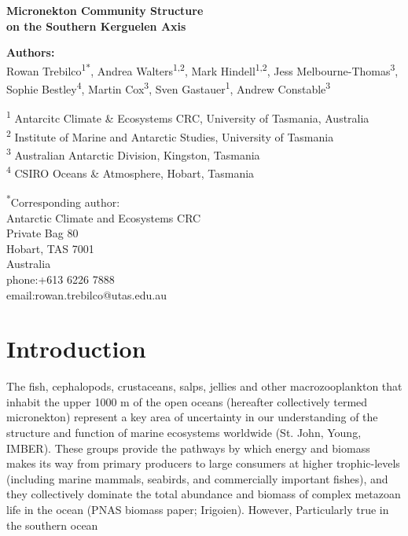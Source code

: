 \documentclass[12pt]{article}
\begin{document}
{\setlength{\parindent}{0cm}
\linenumbers
\doublespacing
\thispagestyle{empty}


\centering \large{\textbf{Micronekton Community Structure \\on the Southern Kerguelen Axis}}

\normalsize
\flushleft

\textbf{Authors:}\\
Rowan Trebilco\textsuperscript{1*},
Andrea Walters\textsuperscript{1,2},
Mark Hindell\textsuperscript{1,2},
Jess Melbourne-Thomas\textsuperscript{3},
Sophie Bestley\textsuperscript{4},
Martin Cox\textsuperscript{3},
Sven Gastauer\textsuperscript{1},
Andrew Constable\textsuperscript{3}


\textsuperscript{1} Antarcitc Climate \& Ecosystems CRC, University of Tasmania, Australia\\
\textsuperscript{2} Institute of Marine and Antarctic Studies, University of Tasmania\\ 
\textsuperscript{3} Australian Antarctic Division, Kingston, Tasmania\\ 
\textsuperscript{4} CSIRO Oceans \& Atmosphere, Hobart, Tasmania

\textsuperscript{*}Corresponding author:\\
Antarctic Climate and Ecosystems CRC\\
Private Bag 80\\
Hobart, TAS 7001\\
Australia\\
phone:+613 6226 7888\\
email:rowan.trebilco@utas.edu.au\\


\clearpage
\section{Introduction}
\linenumbers

The fish, cephalopods, crustaceans, salps, jellies and other macrozooplankton that inhabit the upper 1000 m of the open oceans (hereafter collectively termed micronekton) represent a key area of uncertainty in our understanding of the structure and function of marine ecosystems worldwide (St. John, Young, IMBER).
These groups provide the pathways by which energy and biomass makes its way from primary producers to large consumers at higher trophic-levels (including marine mammals, seabirds, and commercially important fishes), and they collectively dominate the total abundance and biomass of complex metazoan life in the ocean (PNAS biomass paper; Irigoien).
However,  
Particularly true in the southern ocean

}
\end{document}
